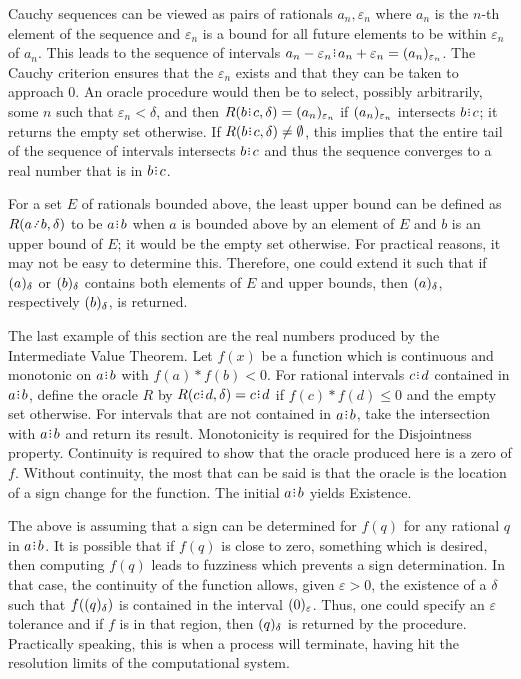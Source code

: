 \documentclass[12pt]{article}
\begin{document}
Cauchy sequences can be viewed as pairs of rationals $a_n, \varepsilon_n$ where $a_n$ is the $n$-th element of the sequence and $\varepsilon_n$ is a bound for all future elements to be within $\varepsilon_n$ of $a_n$. This leads to the sequence of intervals $a_n-\varepsilon_n\rint a_n+\varepsilon_n = \halo[ \varepsilon_n]{a_n}$. The Cauchy criterion ensures that the $\varepsilon_n$ exists and that they can be taken to approach 0. An oracle procedure would then be to select, possibly arbitrarily, some $n$ such that $\varepsilon_n < \delta$, and then  $R(b\rint c, \delta) = \halo[ \varepsilon_n]{a_n}$ if $\halo[\varepsilon_n]{a_n}$ intersects $b\rint c$; it returns the empty set otherwise. If $R(b\rint c, \delta) \neq \emptyset$, this implies that the entire tail of the sequence of intervals intersects $b\rint c$ and thus the sequence converges to a real number that is in $b\rint c$.  

For a set $E$ of rationals bounded above, the least upper bound can be defined as $R(a \lte b, \delta)$ to be $a\rint b$ when $a$ is bounded above by an element of $E$ and $b$ is an upper bound of $E$; it would be the empty set otherwise. For practical reasons, it may not be easy to determine this. Therefore, one could extend it such that if $\halo{a}$ or $\halo{b}$ contains both elements of $E$ and upper bounds, then $\halo{a}$, respectively $\halo{b}$, is returned. 

The last example of this section are the real numbers produced by the Intermediate Value Theorem. Let $f(x)$ be a function which is continuous and monotonic on $a\rint b$ with $f(a)*f(b) < 0$. For rational intervals $c\rint d$ contained in $a\rint b$, define the oracle $R$ by $R(c\rint d, \delta) = c\rint d$ if $f(c)*f(d) \leq 0$ and the empty set otherwise. For intervals that are not contained in $a\rint b$, take the intersection with $a\rint b$ and return its result. Monotonicity is required for the Disjointness property. Continuity is required to show that the oracle produced here is a zero of $f$. Without continuity, the most that can be said is that the oracle is the location of a sign change for the function. The initial $a\rint b$ yields Existence.

The above is assuming that a sign can be determined for $f(q)$ for any rational $q$ in $a\rint b$. It is possible that if $f(q)$ is close to zero, something which is desired, then computing $f(q)$ leads to fuzziness which prevents a sign determination. In that case, the continuity of the function allows, given $\varepsilon > 0$, the existence of a $\delta$ such that $f(\halo{q})$ is contained in the interval $\halo[\varepsilon]{0}$. Thus, one could specify an $\varepsilon$ tolerance and if $f$ is in that region, then $\halo{q}$ is returned by the procedure. Practically speaking, this is when a process will terminate, having hit the resolution limits of the computational system. 
\end{document}
